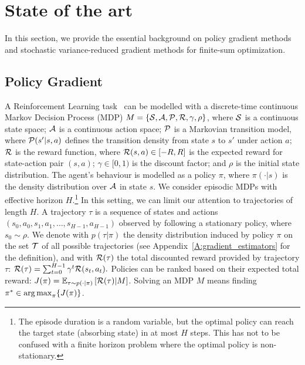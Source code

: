 \chapter{State of the art}\label{chap:art}

\vspace{-0.05in}
In this section, we provide the essential background on policy gradient methods and stochastic variance-reduced gradient methods for finite-sum optimization.
\vspace{-0.05in}

\section{Policy Gradient}\label{sec:PolicyGradient}
\vspace{-0.05in}
A Reinforcement Learning task~\citep{sutton1998reinforcement} can be modelled with a discrete-time continuous Markov Decision Process (MDP) $M = \{\Sspace,\Aspace,\Transition,\Reward,\gamma,\rho\}$, where $\Sspace$ is a continuous state space; $\Aspace$ is a continuous action space; $\Transition$ is a Markovian transition model, where $\Transition(s'|s,a)$ defines the transition density from state $s$ to $s'$ under action $a$; $\Reward$ is the reward function, where $\Reward(s,a) \in [-R,R]$ is the expected reward for state-action pair $(s,a)$;
$\gamma\in[0,1)$ is the discount factor; and $\rho$ is the initial state distribution.
The agent's behaviour is modelled as a policy $\pi$, where $\pi(\cdot|s)$ is the density distribution over $\Aspace$ in state $s$.
We consider episodic MDPs with effective horizon $H$.\footnote{The episode duration is a random variable, but the optimal policy can reach the target state (\ie absorbing state) in at most $H$ steps. This has not to be confused with a finite horizon problem where the optimal policy is non-stationary.} In this setting, we can limit our attention to trajectories of length $H$. A trajectory $\tau$ is a sequence of states and actions $(s_0,a_0,s_1,a_1,\dots,s_{H-1},a_{H-1})$ observed by following a stationary policy, where $s_0 \sim \rho$.
We denote with $p(\tau|\pi)$ the density distribution induced by policy $\pi$ on the set $\Tspace$ of all possible trajectories (see Appendix~\ref{A:gradient_estimators} for the definition), and with $\Reward(\tau)$ the total discounted reward provided by trajectory $\tau$:
%
$\Reward(\tau) = \sum_{t=0}^{H-1}\gamma^t\Reward(s_t,a_t).$
%
Policies can be ranked based on their expected total reward: $J(\pi) = \EVV[\tau \sim p(\cdot|\pi)]{\Reward(\tau)|M}$.
Solving an MDP $M$ means finding $\pi^* \in \argmax_{\pi} \{J(\pi)\}$.

